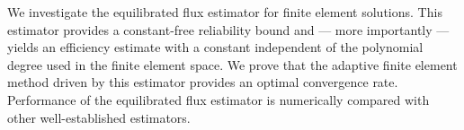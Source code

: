 We investigate the equilibrated flux estimator for finite element solutions. This estimator
provides a constant-free reliability bound and --- more importantly --- yields an efficiency estimate
with a constant independent of the polynomial degree
used in the finite element space. We prove that the adaptive finite element method driven by this estimator provides an optimal convergence rate.
Performance of the equilibrated flux estimator is numerically compared with other well-established estimators.
